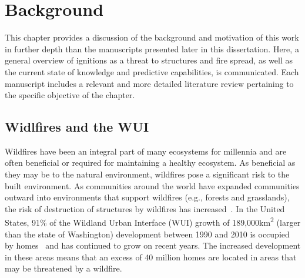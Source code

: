 
\chapter{Background}
\label{chap:literature}
    This chapter provides a discussion of the background and motivation of this work in further depth than the manuscripts presented later in this dissertation. Here, a general overview of ignitions as a threat to structures and fire spread, as well as the current state of knowledge and predictive capabilities, is communicated. Each manuscript includes a relevant and more detailed literature review pertaining to the specific objective of the chapter. 

\section{Widlfires and the WUI}
    Wildfires have been an integral part of many ecosystems for millennia and are often beneficial or required for maintaining a healthy ecosystem. As beneficial as they may be to the natural environment, wildfires pose a significant risk to the built environment. As communities around the world have expanded communities outward into environments that support wildfires (e.g., forests and grasslands), the risk of destruction of structures by wildfires has increased~\cite{Hammer2009DemographicManagement}. In the United States, 91\% of the Wildland Urban Interface (WUI)  growth of 189,000\si{\kilo\meter\squared} (larger than the state of Washington) development between 1990 and 2010 is occupied by homes~\cite{Radeloff2017} and has continued to grow on recent years. The increased development in these areas means that an excess of 40 million homes are located in areas that may be threatened by a wildfire. 
    
